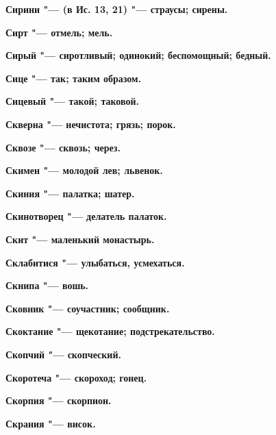 \begin{mymulticols}{2}
\bfseries Сирини\normalfont{} "--- (в Ис. 13, 21) "--- страусы; сирены. 




\bfseries Сирт\normalfont{} "--- отмель; мель. 




\bfseries Сирый\normalfont{} "--- сиротливый; одинокий; беспомощный; бедный. 




\bfseries Сице\normalfont{} "--- так; таким образом. 




\bfseries Сицевый\normalfont{} "--- такой; таковой. 




\bfseries Скверна\normalfont{} "--- нечистота; грязь; порок. 




\bfseries Сквозе\normalfont{} "--- сквозь; через. 




\bfseries Скимен\normalfont{} "--- молодой лев; львенок. 




\bfseries Скиния\normalfont{} "--- палатка; шатер. 




\bfseries Скинотворец\normalfont{} "--- делатель палаток. 




\bfseries Скит\normalfont{} "--- маленький монастырь. 




\bfseries Склабитися\normalfont{} "--- улыбаться, усмехаться. 




\bfseries Скнипа\normalfont{} "--- вошь. 




\bfseries Сковник\normalfont{} "--- соучастник; сообщник. 




\bfseries Скоктание\normalfont{} "--- щекотание; подстрекательство. 




\bfseries Скопчий\normalfont{} "--- скопческий. 




\bfseries Скоротеча\normalfont{} "--- скороход; гонец. 




\bfseries Скорпия\normalfont{} "--- скорпион. 




\bfseries Скрания\normalfont{} "--- висок. 





\end{mymulticols}
